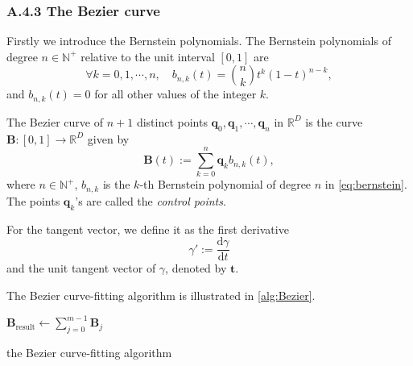 \documentclass[a4paper]{article}
\begin{document}
\subsubsection*{A.4.3 The Bezier curve}

Firstly we introduce the Bernstein polynomials. The Bernstein polynomials of degree $n \in \mathbb{N}^+$ relative to the unit interval $[0, 1]$ are
\begin{equation}
    \forall k = 0, 1, \cdots, n, \quad b_{n, k}(t) = \binom{n}{k} t^k (1 - t)^{n - k},
    \label{eq:bernstein}
\end{equation}
and $b_{n, k}(t) = 0$ for all other values of the integer $k$.

The Bezier curve of $n + 1$ distinct points $\mathbf{q}_0, \mathbf{q}_1, \cdots, \mathbf{q}_n$ in $\mathbb{R}^D$ is the curve $\mathbf{B}: [0, 1] \rightarrow \mathbb{R}^D$ given by
\begin{equation}
    \mathbf{B}(t) := \sum_{k = 0}^n \mathbf{q}_k b_{n, k}(t),
    \label{eq:bezier}
\end{equation}
where $n \in \mathbb{N}^+$, $b_{n, k}$ is the $k$-th Bernstein polynomial of degree $n$ in \cref{eq:bernstein}. 
The points $\mathbf{q}_k$'s are called the \textit{control points}. 

For the tangent vector, we define it as the first derivative 
\begin{equation}
    \gamma' := \frac{\mathrm{d}\gamma}{\mathrm{d}t}
    \label{eq:tangent_vector}
\end{equation}
and the unit tangent vector of $\gamma$, denoted by $\mathbf{t}$.

The Bezier curve-fitting algorithm is illustrated in \cref{alg:Bezier}.

\begin{algorithm}[H]
    \BlankLine
    $\mathbf{B}_{\mathrm{result}} \leftarrow \sum_{j = 0}^{m - 1} \mathbf{B}_j$ \;
    \caption{the Bezier curve-fitting algorithm}
    \label{alg:Bezier}
\end{algorithm}
\end{document}
